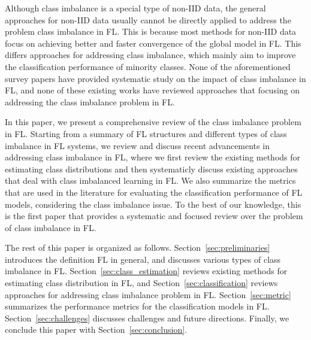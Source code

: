 \documentclass[10pt,journal,compsoc]{IEEEtran}
\begin{document}
Although class imbalance is a special type of non-IID data, the general approaches for non-IID data usually cannot be directly applied to address the problem class imbalance in FL. This is because most methods for non-IID data focus on achieving better and faster convergence of the global model in FL. This differs approaches for addressing class imbalance, which mainly aim to improve the classification performance of minority classes. None of the aforementioned survey papers have provided systematic study on the impact of class imbalance in FL, and none of these existing works have reviewed approaches that focusing on addressing the class imbalance problem in FL.

In this paper, we present a comprehensive review of the class imbalance problem in FL. Starting from a summary of FL structures and different types of class imbalance in FL systems, we review and discuss recent advancements in addressing class imbalance in FL, where we first review the existing methods for estimating class distributions and then systematicly discuss existing approaches that deal with class imbalanced learning in FL. We also summarize the metrics that are used in the literature for evaluating the classification performance of FL models, considering the class imbalance issue. To the best of our knowledge, this is the first paper that provides a systematic and focused review over the problem of class imbalance in FL. 


The rest of this paper is organized as follows. Section~\ref{sec:preliminaries} introduces the definition FL in general, and discusses various types of class imbalance in FL. Section~\ref{sec:class_estimation} reviews existing methods for estimating class distribution in FL, and Section~\ref{sec:classification} reviews approaches for addressing class imbalance problem in FL. Section~\ref{sec:metric} summarizes the performance metrics for the classification models in FL. Section~\ref{sec:challenges} discusses challenges and future directions. Finally, we conclude this paper with Section~\ref{sec:conclusion}.
\vspace{-0.2cm}
\end{document}

